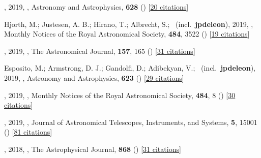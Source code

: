 \item[{\color{numcolor}\scriptsize17}] , 2019, , Astronomy and Astrophysics, \textbf{628} () [\href{https://ui.adsabs.harvard.edu/abs/2019A&A...628A..64P}{20 citations}]

\item[{\color{numcolor}\scriptsize16}] Hjorth, M.; Justesen, A. B.; Hirano, T.; Albrecht, S.; \etal\ (incl.\ \textbf{jpdeleon}), 2019, , Monthly Notices of the Royal Astronomical Society, \textbf{484}, 3522 () [\href{https://ui.adsabs.harvard.edu/abs/2019MNRAS.484.3522H}{19 citations}]

\item[{\color{numcolor}\scriptsize15}] , 2019, , The Astronomical Journal, \textbf{157}, 165 () [\href{https://ui.adsabs.harvard.edu/abs/2019AJ....157..165A}{31 citations}]

\item[{\color{numcolor}\scriptsize14}] Esposito, M.; Armstrong, D. J.; Gandolfi, D.; Adibekyan, V.; \etal\ (incl.\ \textbf{jpdeleon}), 2019, , Astronomy and Astrophysics, \textbf{623} () [\href{https://ui.adsabs.harvard.edu/abs/2019A&A...623A.165E}{29 citations}]

\item[{\color{numcolor}\scriptsize13}] , 2019, , Monthly Notices of the Royal Astronomical Society, \textbf{484}, 8 () [\href{https://ui.adsabs.harvard.edu/abs/2019MNRAS.484....8L}{30 citations}]

\item[{\color{numcolor}\scriptsize12}] , 2019, , Journal of Astronomical Telescopes, Instruments, and Systems, \textbf{5}, 15001 () [\href{https://ui.adsabs.harvard.edu/abs/2019JATIS...5a5001N}{81 citations}]

\item[{\color{numcolor}\scriptsize11}] , 2018, , The Astrophysical Journal, \textbf{868} () [\href{https://ui.adsabs.harvard.edu/abs/2018ApJ...868L...3M}{31 citations}]

